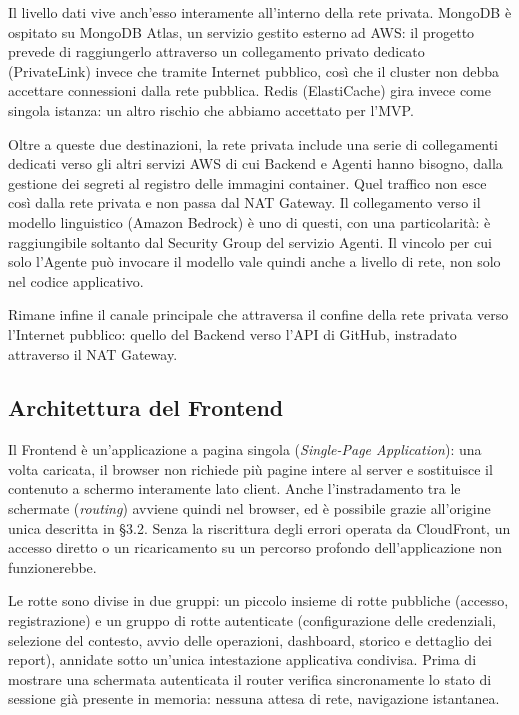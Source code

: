 \documentclass[12pt, a4paper]{article}
\begin{document}
Il livello dati vive anch'esso interamente all'interno della rete privata. MongoDB è ospitato su MongoDB Atlas, un servizio gestito esterno ad AWS: il progetto prevede di raggiungerlo attraverso un collegamento privato dedicato (PrivateLink) invece che tramite Internet pubblico, così che il cluster non debba accettare connessioni dalla rete pubblica. Redis (ElastiCache) gira invece come singola istanza: un altro rischio che abbiamo accettato per l'MVP.

Oltre a queste due destinazioni, la rete privata include una serie di collegamenti dedicati verso gli altri servizi AWS di cui Backend e Agenti hanno bisogno, dalla gestione dei segreti al registro delle immagini container. Quel traffico non esce così dalla rete privata e non passa dal NAT Gateway. Il collegamento verso il modello linguistico (Amazon Bedrock) è uno di questi, con una particolarità: è raggiungibile soltanto dal Security Group del servizio Agenti. Il vincolo per cui solo l'Agente può invocare il modello vale quindi anche a livello di rete, non solo nel codice applicativo.

Rimane infine il canale principale che attraversa il confine della rete privata verso l'Internet pubblico: quello del Backend verso l'API di GitHub, instradato attraverso il NAT Gateway.

\subsection{Architettura del Frontend}
\label{subsec:frontend}

Il Frontend è un'applicazione a pagina singola (\textit{Single-Page Application}): una volta caricata, il browser non richiede più pagine intere al server e sostituisce il contenuto a schermo interamente lato client. Anche l'instradamento tra le schermate (\textit{routing}) avviene quindi nel browser, ed è possibile grazie all'origine unica descritta in §3.2. Senza la riscrittura degli errori operata da CloudFront, un accesso diretto o un ricaricamento su un percorso profondo dell'applicazione non funzionerebbe.

Le rotte sono divise in due gruppi: un piccolo insieme di rotte pubbliche (accesso, registrazione) e un gruppo di rotte autenticate (configurazione delle credenziali, selezione del contesto, avvio delle operazioni, dashboard, storico e dettaglio dei report), annidate sotto un'unica intestazione applicativa condivisa. Prima di mostrare una schermata autenticata il router verifica sincronamente lo stato di sessione già presente in memoria: nessuna attesa di rete, navigazione istantanea.
\end{document}
